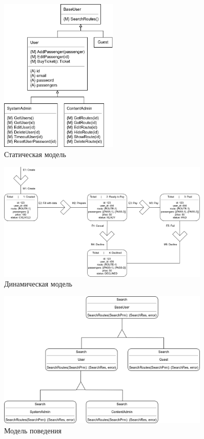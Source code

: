 \begin{figure}[H]
    \centering
    \includegraphics[width=0.5\textwidth]{model/static.png}
    \caption{Статическая модель}
\end{figure}

\newpage
\begin{figure}[H]
    \centering
    \includegraphics[width=0.9\textwidth]{model/dynamic.png}
    \caption{Динамическая модель}
\end{figure}

\newpage
\begin{figure}[H]
    \centering
    \includegraphics[width=0.9\textwidth]{model/behavior.png}
    \caption{Модель поведения}
\end{figure}
